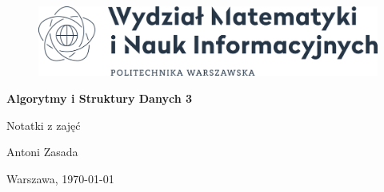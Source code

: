 \documentclass[a4paper,12pt]{article}
\begin{document}
\begin{titlepage}
    \begin{center}
        \begin{figure}[H]
            \centering
            \includegraphics[width=\textwidth]{mini.png}
        \end{figure}

        \vspace{1cm}
        \Huge \textsf{\textbf{Algorytmy i Struktury Danych 3}}

        \vspace{1cm}
        \LARGE \textsf{Notatki z zajęć}

        \vspace{1cm}
        \Large \textsf{Antoni Zasada}

        \vfill
        \Large \textsf{Warszawa, \today}
    \end{center}
\end{titlepage}

\tableofcontents
\pagebreak
\end{document}
